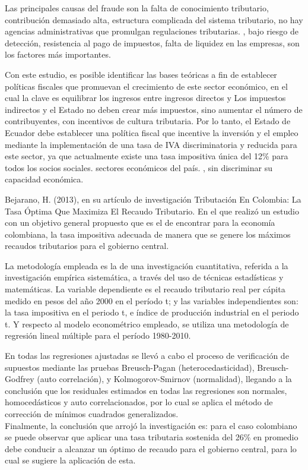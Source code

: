 \documentclass[
  jou,
  floatsintext,
  longtable,
  a4paper,
  nolmodern,
  notxfonts,
  notimes,
  12pt,
  colorlinks=true,linkcolor=blue,citecolor=blue,urlcolor=blue]{apa7}
\begin{document}
Las principales causas del fraude son la falta de conocimiento
tributario, contribución demasiado alta, estructura complicada del
sistema tributario, no hay agencias administrativas que promulgan
regulaciones tributarias. , bajo riesgo de detección, resistencia al
pago de impuestos, falta de liquidez en las empresas, son los factores
más importantes.

Con este estudio, es posible identificar las bases teóricas a fin de
establecer políticas fiscales que promuevan el crecimiento de este
sector económico, en el cual la clave es equilibrar los ingresos entre
ingresos directos y Los impuestos indirectos y el Estado no deben crear
más impuestos, sino aumentar el número de contribuyentes, con incentivos
de cultura tributaria. Por lo tanto, el Estado de Ecuador debe
establecer una política fiscal que incentive la inversión y el empleo
mediante la implementación de una tasa de IVA discriminatoria y reducida
para este sector, ya que actualmente existe una tasa impositiva única
del 12\% para todos los socios sociales. sectores económicos del país. ,
sin discriminar su capacidad económica.

Bejarano, H. (2013), en su artículo de investigación Tributación En
Colombia: La Tasa Óptima Que Maximiza El Recaudo Tributario. En el que
realizó un estudio con un objetivo general propuesto que es el de
encontrar para la economía colombiana, la tasa impositiva adecuada de
manera que se genere los máximos recaudos tributarios para el gobierno
central.

La metodología empleada es la de una investigación cuantitativa,
referida a la investigación empírica sistemática, a través del uso de
técnicas estadísticas y matemáticas. La variable dependiente es el
recaudo tributario real per cápita medido en pesos del año 2000 en el
período t; y las variables independientes son: la tasa impositiva en el
periodo t, e índice de producción industrial en el periodo t. Y respecto
al modelo econométrico empleado, se utiliza una metodología de regresión
lineal múltiple para el período 1980-2010.

En todas las regresiones ajustadas se llevó a cabo el proceso de
verificación de supuestos mediante las pruebas Breusch-Pagan
(heterocedasticidad), Breusch-Godfrey (auto correlación), y
Kolmogorov-Smirnov (normalidad), llegando a la conclusión que los
residuales estimados en todas las regresiones son normales,
homocedásticos y auto correlacionados, por lo cual se aplica el método
de corrección de mínimos cuadrados generalizados.\\
Finalmente, la conclusión que arrojó la investigación es: para el caso
colombiano se puede observar que aplicar una tasa tributaria sostenida
del 26\% en promedio debe conducir a alcanzar un óptimo de recaudo para
el gobierno central, para lo cual se sugiere la aplicación de esta.
\end{document}
